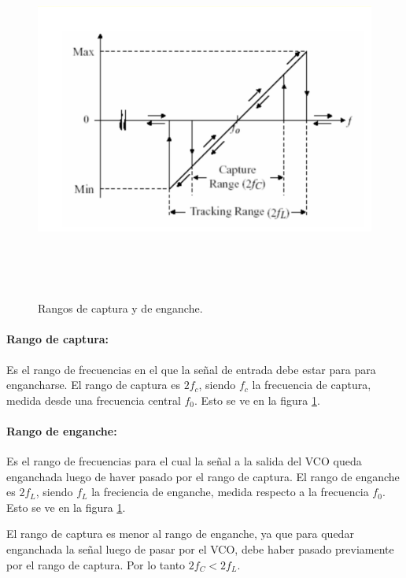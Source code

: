 \begin{figure}[H] %
	\centering
	\includegraphics[width=12cm,height=12cm,keepaspectratio]{../EJ2/imagenes/rango.png}
	\caption{Rangos de captura y de enganche.}
	\label{rango}
\end{figure}

	\paragraph{Rango de captura:} Es el rango de frecuencias en el que la señal de entrada debe estar para para engancharse. El rango de captura es $2f_c$, siendo $f_c$ la frecuencia de captura, medida desde una frecuencia central $f_0$. Esto se ve en la figura \ref{rango}.

	\paragraph{Rango de enganche:} Es el rango de frecuencias para el cual la señal a la salida del VCO queda enganchada luego de haver pasado por el rango de captura. El rango de enganche es $2f_L$, siendo $f_L$ la freciencia de enganche, medida respecto a la frecuencia $f_0$. Esto se ve en la figura \ref{rango}.
	
	El rango de captura es menor al rango de enganche, ya que para quedar enganchada la señal luego de pasar por el VCO, debe haber pasado previamente por el rango de captura. Por lo tanto $2f_C<2f_L$.

